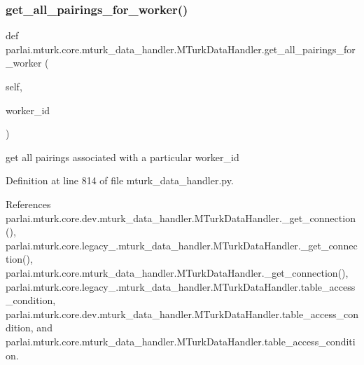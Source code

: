 \subsubsection{\texorpdfstring{get\+\_\+all\+\_\+pairings\+\_\+for\+\_\+worker()}{get\_all\_pairings\_for\_worker()}}
{\footnotesize\ttfamily def parlai.\+mturk.\+core.\+mturk\+\_\+data\+\_\+handler.\+M\+Turk\+Data\+Handler.\+get\+\_\+all\+\_\+pairings\+\_\+for\+\_\+worker (\begin{DoxyParamCaption}\item[{}]{self,  }\item[{}]{worker\+\_\+id }\end{DoxyParamCaption})}

\begin{DoxyVerb}get all pairings associated with a particular worker_id\end{DoxyVerb}
 

Definition at line 814 of file mturk\+\_\+data\+\_\+handler.\+py.



References parlai.\+mturk.\+core.\+dev.\+mturk\+\_\+data\+\_\+handler.\+M\+Turk\+Data\+Handler.\+\_\+get\+\_\+connection(), parlai.\+mturk.\+core.\+legacy\+\_.\+mturk\+\_\+data\+\_\+handler.\+M\+Turk\+Data\+Handler.\+\_\+get\+\_\+connection(), parlai.\+mturk.\+core.\+mturk\+\_\+data\+\_\+handler.\+M\+Turk\+Data\+Handler.\+\_\+get\+\_\+connection(), parlai.\+mturk.\+core.\+legacy\+\_.\+mturk\+\_\+data\+\_\+handler.\+M\+Turk\+Data\+Handler.\+table\+\_\+access\+\_\+condition, parlai.\+mturk.\+core.\+dev.\+mturk\+\_\+data\+\_\+handler.\+M\+Turk\+Data\+Handler.\+table\+\_\+access\+\_\+condition, and parlai.\+mturk.\+core.\+mturk\+\_\+data\+\_\+handler.\+M\+Turk\+Data\+Handler.\+table\+\_\+access\+\_\+condition.


